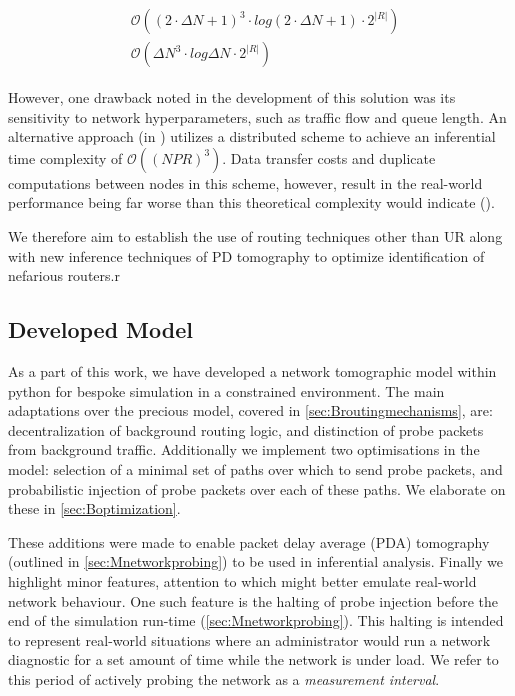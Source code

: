 \begin{align}
\label{eq:mcmcbigo}
    \begin{split}
        &\mathcal{O}( (2\cdot \Delta N + 1)^3 \cdot log(2\cdot \Delta N + 1)\cdot 2^{|R|})\\
        &\mathcal{O}(\Delta N ^3 \cdot log \Delta N \cdot 2^{|R|})
    \end{split}
\end{align}\par
However, one drawback noted in the development of this solution was its sensitivity to network hyperparameters, such as traffic flow and queue length. An alternative approach (in \cite{kolar_distributed_2020}) utilizes a distributed scheme to achieve an inferential time complexity of $\mathcal{O}((NPR)^3)$. Data transfer costs and duplicate computations between nodes in this scheme, however, result in the real-world performance being far worse than this theoretical complexity would indicate (\cite{kolar_distributed_2020}).\par
We therefore aim to establish the use of routing techniques other than UR along with new inference techniques of PD tomography to optimize identification of nefarious routers.r\par

\subsection{Developed Model}
\label{ssec:Idevelopedmodels}
As a part of this work, we have developed a network tomographic model within python for bespoke simulation in a constrained environment. The main adaptations over the precious model, covered in \cref{sec:Broutingmechanisms}, are: decentralization of background routing logic, and distinction of probe packets from background traffic. Additionally we implement two optimisations in the model: selection of a minimal set of paths over which to send probe packets, and probabilistic injection of probe packets over each of these paths. We elaborate on these in \cref{sec:Boptimization}.\par
These additions were made to enable packet delay average (PDA) tomography (outlined in \cref{sec:Mnetworkprobing}) to be used in inferential analysis. Finally we highlight minor features, attention to which might better emulate real-world network behaviour. One such feature is the halting of probe injection before the end of the simulation run-time (\cref{sec:Mnetworkprobing}). This halting is intended to represent real-world situations where an administrator would run a network diagnostic for a set amount of time while the network is under load. We refer to this period of actively probing the network as a \textit{measurement interval}.

